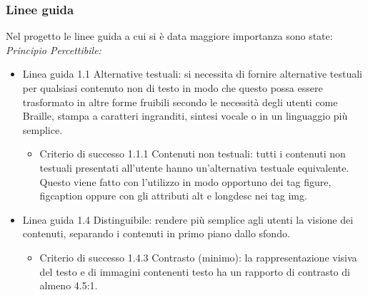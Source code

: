 \documentclass[a4paper,final,12pt]{report}
\begin{document}
\subsubsection{Linee guida}
Nel progetto le linee guida a cui si è data maggiore importanza sono state:\\
\emph{Principio Percettibile:}
\begin{itemize}
\item Linea guida 1.1 Alternative testuali: si necessita di fornire alternative testuali per qualsiasi contenuto non di testo in modo che questo possa essere trasformato in altre forme fruibili secondo le necessità degli utenti come Braille, stampa a caratteri ingranditi, sintesi vocale o in un linguaggio più semplice.
\begin{itemize}
\item Criterio di successo 1.1.1 Contenuti non testuali: tutti i contenuti non testuali presentati all'utente hanno un'alternativa testuale equivalente. Questo viene fatto con l'utilizzo in modo opportuno dei tag figure, figcaption oppure con gli attributi alt e longdesc nei tag img.
\end{itemize}
\item Linea guida 1.4 Distinguibile: rendere più semplice agli utenti la visione dei contenuti, separando i contenuti in primo piano dallo sfondo.
\begin{itemize}
\item Criterio di successo 1.4.3 Contrasto (minimo): la rappresentazione visiva del testo e di immagini contenenti testo ha un rapporto di
contrasto di almeno 4.5:1.
\end{itemize}


\end{itemize}
\end{document}
